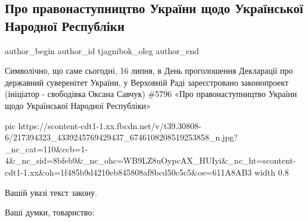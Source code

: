  
 
 
 
 
 
\subsection{Про правонаступництво України щодо Української Народної Республіки}
\label{sec:16_07_2021.fb.tjagnibok_oleg.1.unr_ukraina_pravopreemnik}
 
\ifcmt
 author_begin
   author_id tjagnibok_oleg
 author_end
\fi

Символічно, що саме сьогодні, 16 липня, в День проголошення Декларації про
державний суверенітет України, у Верховній Раді зареєстровано законопроект
(ініціатор - свободівка Оксана Савчук) \#5796 «Про правонаступництво України
щодо Української Народної Республіки»

\ifcmt
  pic https://scontent-cdt1-1.xx.fbcdn.net/v/t39.30808-6/217394323_4339245769429437_6746108208519253858_n.jpg?_nc_cat=110&ccb=1-4&_nc_sid=8bfeb9&_nc_ohc=WB9LZ8uOypcAX_HUIyi&_nc_ht=scontent-cdt1-1.xx&oh=1f485b9d4210eb845808af8bcd50c5c5&oe=611A8AB3
  width 0.8
\fi

Вашій увазі текст закону. 

Ваші думки, товариство:

